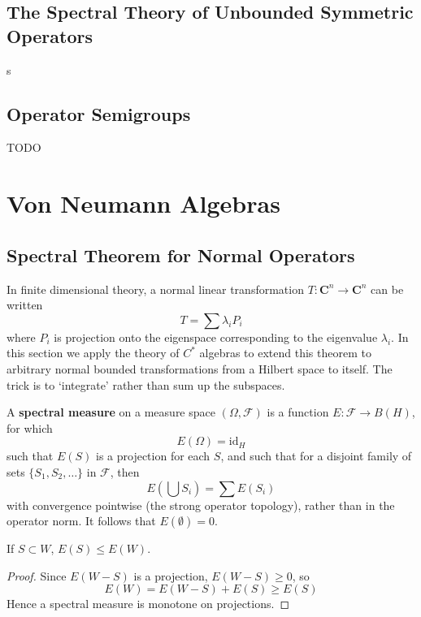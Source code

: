 \section{The Spectral Theory of Unbounded Symmetric Operators}

s






\section{Operator Semigroups}

TODO






\chapter{Von Neumann Algebras}





\section{Spectral Theorem for Normal Operators}

In finite dimensional theory, a normal linear transformation $T: \mathbf{C}^n \to \mathbf{C}^n$ can be written
%
\[ T = \sum \lambda_i P_i \]
%
where $P_i$ is projection onto the eigenspace corresponding to the eigenvalue $\lambda_i$. In this section we apply the theory of $C^*$ algebras to extend this theorem to arbitrary normal bounded transformations from a Hilbert space to itself. The trick is to `integrate' rather than sum up the subspaces.

A {\bf spectral measure} on a measure space $(\Omega, \mathcal{F})$ is a function $E: \mathcal{F} \to B(H)$, for which
%
\[ E(\Omega) = \text{id}_H \]
%
such that $E(S)$ is a projection for each $S$, and such that for a disjoint family of sets $\{ S_1, S_2, \dots \}$ in $\mathcal{F}$, then
%
\[ E \left( \bigcup S_i \right) = \sum E(S_i) \]
%
with convergence pointwise (the strong operator topology), rather than in the operator norm. It follows that $E(\emptyset) = 0$.

\begin{lemma}
    If $S \subset W$, $E(S) \leq E(W)$.
\end{lemma}
\begin{proof}
    Since $E(W - S)$ is a projection, $E(W - S) \geq 0$, so
    \[ E(W) = E(W - S) + E(S) \geq E(S) \]
    Hence a spectral measure is monotone on projections.
\end{proof}

